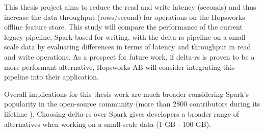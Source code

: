This thesis project aims to reduce the read and write latency (seconds) and thus increase the data throughput (rows/second) for operations on the Hopsworks offline feature store. This study will compare the performance of the current legacy pipeline, Spark-based for writing, with the delta-rs pipeline on a small-scale data by evaluating differences in terms of latency and throughput in read and write operations. As a prospect for future work, if delta-rs is proven to be a more performant alternative, Hopsworks \gls{AB} will consider integrating this pipeline into their application.

Overall implications for this thesis work are much broader considering Spark's popularity in the open-source community (more than 2800 contributors during its lifetime \cite{ApacheSparkOpen}). Choosing delta-rs over Spark gives developers a broader range of alternatives when working on a small-scale data (1 GB - 100 GB).
